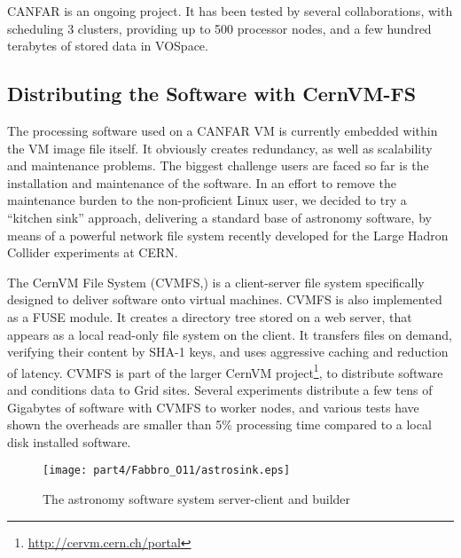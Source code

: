 CANFAR is an ongoing project. It has been tested by several collaborations, with scheduling 3 clusters, providing up to 500 processor nodes, and a few hundred terabytes of stored data in VOSpace.

\subsection{Distributing the Software with CernVM-FS}
The processing software used on a CANFAR VM is currently embedded within the VM image file itself. It obviously creates redundancy, as well as scalability and maintenance problems. The biggest challenge users are faced so far is the installation and maintenance of the software. In an effort to remove the maintenance burden to the non-proficient Linux user, we decided to try a ``kitchen sink'' approach, delivering a standard base of astronomy software, by means of a powerful network file system recently developed for the Large Hadron Collider experiments at CERN.

The CernVM File System (CVMFS,\cite{blomer11}) is a client-server file system specifically designed to deliver software onto virtual machines. CVMFS is also implemented as a FUSE module. It creates a directory tree stored on a web server, that appears as a local read-only file system on the client. It transfers files on demand, verifying their content by SHA-1 keys, and uses aggressive caching and reduction of latency. CVMFS is part of the larger CernVM project\footnote{\url{http://cervm.cern.ch/portal}}, to distribute software and conditions data to Grid sites. Several experiments distribute a few tens of Gigabytes of software with CVMFS to worker nodes, and various tests have shown the overheads are smaller than 5\% processing time compared to a local disk installed software.

\begin{center}
  \begin{figure}
    \texttt{[image: part4/Fabbro\_O11/astrosink.eps]}
    \caption{The astronomy software system server-client and builder}
  \end{figure}  
\end{center}

